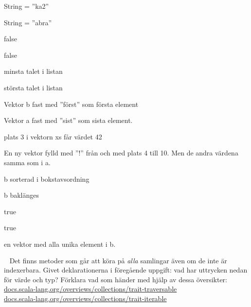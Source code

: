 \Subtask {}

\Subtask {}

\Subtask {}

\Subtask {}

\Subtask {}



\SOLUTION


\TaskSolved \what
 

\SubtaskSolved   String = ''ka2''

\SubtaskSolved   String = ''abra''

\SubtaskSolved   false

\SubtaskSolved   false



\SubtaskSolved   minsta talet i listan

\SubtaskSolved   största talet i listan



\SubtaskSolved   Vektor b fast med ''först'' som första element

\SubtaskSolved   Vektor a fast med ''sist'' som sista element.

\SubtaskSolved   plats 3 i vektorn xs får värdet 42

\SubtaskSolved   En ny vektor fylld med ''!'' från och med plats 4 till 10. Men de andra värdena samma som i a.

\SubtaskSolved   b sorterad i bokstavsordning

\SubtaskSolved   b baklänges

\SubtaskSolved   true

\SubtaskSolved   true

\SubtaskSolved   en vektor med alla unika element i b.


\QUESTEND









\QUESTBEGIN

\Task  \what~  Det finns metoder som går att köra på \emph{alla} samlingar även om de inte är indexerbara. Givet deklarationerna i föregående uppgift: vad har uttrycken nedan för värde och typ? Förklara vad som händer med hjälp av dessa översikter: \\ \href{http://docs.scala-lang.org/overviews/collections/trait-traversable}{docs.scala-lang.org/overviews/collections/trait-traversable} \\ \href{http://docs.scala-lang.org/overviews/collections/trait-iterable}{docs.scala-lang.org/overviews/collections/trait-iterable}

